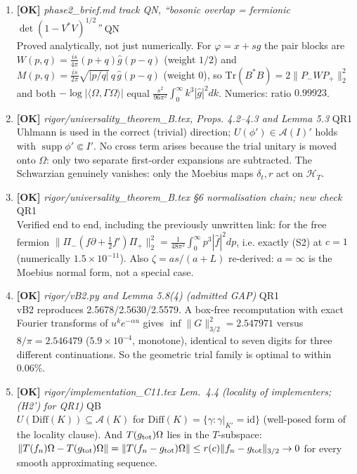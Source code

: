 \documentclass[11pt]{article}
\begin{document}
\begin{enumerate}[leftmargin=1.6em,itemsep=6pt]
\item \textbf{[OK]} \emph{phase2\_brief.md track QN, ``bosonic overlap = fermionic \(\det(1-V^*V)^{1/2}\)''} \hfill\textsc{QN}\\ Proved analytically, not just numerically. For \(\varphi=x+sg\) the pair blocks are \(W(p,q)=\frac{is}{4\pi}(p+q)\hat g(p-q)\) (weight \(1/2\)) and \(M(p,q)=\frac{is}{2\pi}\sqrt{|p/q|}\,q\,\hat g(p-q)\) (weight \(0\)), so \(\mathrm{Tr}(B^*B)=2\lVert P_-WP_+\rVert_2^2\) and both \(-\log|\langle\Omega,\Gamma\Omega\rangle|\) equal \(\frac{s^2}{96\pi^2}\int_0^\infty k^3|\hat g|^2dk\). Numerics: ratio \(0.99923\).
\item \textbf{[OK]} \emph{rigor/universality\_theorem\_B.tex, Props. 4.2--4.3 and Lemma 5.3} \hfill\textsc{QR1}\\ Uhlmann is used in the correct (trivial) direction; \(U(\phi')\in\mathcal A(I)'\) holds with \(\operatorname{supp}\phi'\Subset I'\). No cross term arises because the trial unitary is moved onto \(\Omega\): only two separate first-order expansions are subtracted. The Schwarzian genuinely vanishes: only the Moebius maps \(\delta_t,r\) act on \(\mathcal H_T\).
\item \textbf{[OK]} \emph{rigor/universality\_theorem\_B.tex \S6 normalisation chain; new check} \hfill\textsc{QR1}\\ Verified end to end, including the previously unwritten link: for the free fermion \(\lVert\Pi_-(f\partial+\tfrac12f')\Pi_+\rVert_2^2=\frac1{48\pi^2}\int_0^\infty p^3|\hat f|^2dp\), i.e. exactly (S2) at \(c=1\) (numerically \(1.5\times10^{-11}\)). Also \(\zeta=as/(a+L)\) re-derived: \(a=\infty\) is the Moebius normal form, not a special case.
\item \textbf{[OK]} \emph{rigor/vB2.py and Lemma 5.8(4) (admitted GAP)} \hfill\textsc{QR1}\\ vB2 reproduces 2.5678/2.5630/2.5579. A box-free recomputation with exact Fourier transforms of \(u^ke^{-\alpha u}\) gives \(\inf\lVert G\rVert_{3/2}^2=2.547971\) versus \(8/\pi=2.546479\) (\(5.9\times10^{-4}\), monotone), identical to seven digits for three different continuations. So the geometric trial family is optimal to within 0.06\%.
\item \textbf{[OK]} \emph{rigor/implementation\_C11.tex Lem.~4.4 (locality of implementers; (H2') for QR1)} \hfill\textsc{QB}\\ \(U(\mathrm{Diff}(K))\subseteq\mathcal A(K)\) for \(\mathrm{Diff}(K)=\{\gamma:\gamma|_{K'}=\mathrm{id}\}\) (well-posed form of the locality clause). And \(T(g_{\rm tot})\Omega\) lies in the \(T\)-subspace: \(\lVert T(f_n)\Omega-T(g_{\rm tot})\Omega\rVert=\lVert T(f_n-g_{\rm tot})\Omega\rVert\le r(c)\lVert f_n-g_{\rm tot}\rVert_{3/2}\to0\) for every smooth approximating sequence.

\end{enumerate}
\end{document}
